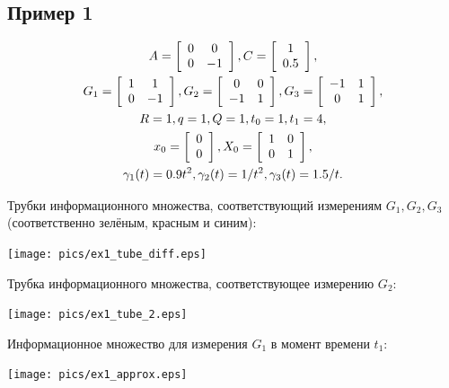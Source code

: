 \documentclass[12pt]{article}
\begin{document}
\subsection{Пример 1}
\begin{gather}
A = \left[ \begin{array}{cc}
0 & 0\\
0 & -1
\end{array} \right],
C = \left[ \begin{array}{cc}
1 \\
0.5
\end{array} \right], \notag \\
G_1 = \left[ \begin{array}{cc}
1 & 1\\
0 & -1
\end{array} \right],
G_2 = \left[ \begin{array}{cc}
0 & 0\\
-1 & 1
\end{array} \right],
G_3 = \left[ \begin{array}{cc}
-1 & 1\\
0 & 1
\end{array} \right], \notag\\
R = 1, q = 1, Q = 1, t_0 = 1, t_1 = 4, \notag\\
x_0 = \left[ \begin{array}{cc}
0\\
0
\end{array} \right],
X_0 = \left[ \begin{array}{cc}
1 & 0\\
0 & 1
\end{array} \right], \notag \\
\gamma_1(t) = 0.9 t^2, \gamma_2(t) = 1/t^2, \gamma_3(t) = 1.5/t. \notag
\end{gather}

Трубки информационного множества, соответствующий измерениям $G_1, G_2, G_3$ (соответственно зелёным, красным и синим):

\texttt{[image: pics/ex1\_tube\_diff.eps]}

Трубка информационного множества, соответствующее измерению $G_2$:

\texttt{[image: pics/ex1\_tube\_2.eps]}

Информационное множество для измерения $G_1$ в момент времени $t_1$:

\texttt{[image: pics/ex1\_approx.eps]}
\end{document}
